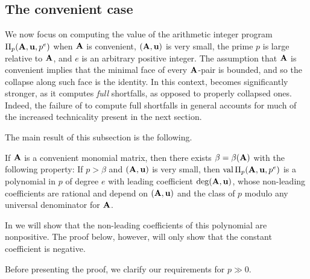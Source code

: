 \documentclass{article}
\begin{document}
\subsection{The convenient case}
\label{convenient: SS}

We now focus on computing the value of the arithmetic integer program $\Pi_p(\mathbf{A},\mathbf{u}, p^e)$ when $\mathbf{A}$ is convenient, $(\mathbf{A},\mathbf{u})$ is very small, the prime $p$ is large relative to $\mathbf{A}$, and $e$ is an arbitrary positive integer.
The assumption that $\mathbf{A}$ is convenient implies that the minimal face of every $\mathbf{A}$-pair is bounded, and so the collapse along such face is the identity.
In this context,  becomes significantly stronger, as it computes \emph{full} shortfalls, as opposed to properly collapsed ones.
Indeed, the failure of  to compute full shortfalls in general accounts for much of the increased technicality present in the next section.

The main result of this subsection is the following.

\begin{theorem}
   \label{m-primary AIP: T}
   If $\mathbf{A}$ is a convenient monomial matrix, then there exists $\beta=\beta(\mathbf{A})$ with the following property\textup:
   If $p > \beta$ and $(\mathbf{A},\mathbf{u})$ is very small, then $\operatorname{val} \Pi_p(\mathbf{A},\mathbf{u},p^e)$ is a polynomial in $p$ of degree $e$ with leading coefficient $\operatorname{deg}(\mathbf{A},\mathbf{u})$, whose non-leading coefficients are rational and depend on $(\mathbf{A},\mathbf{u})$ and the class of $p$ modulo any universal denominator for $\mathbf{A}$.
\end{theorem}

\begin{remark}
   In  we will show that the non-leading coefficients of this polynomial are nonpositive.
   The proof below, however, will only show that the constant coefficient is negative.
\end{remark}

Before presenting the proof, we clarify our requirements for $p\gg 0$.
\end{document}
